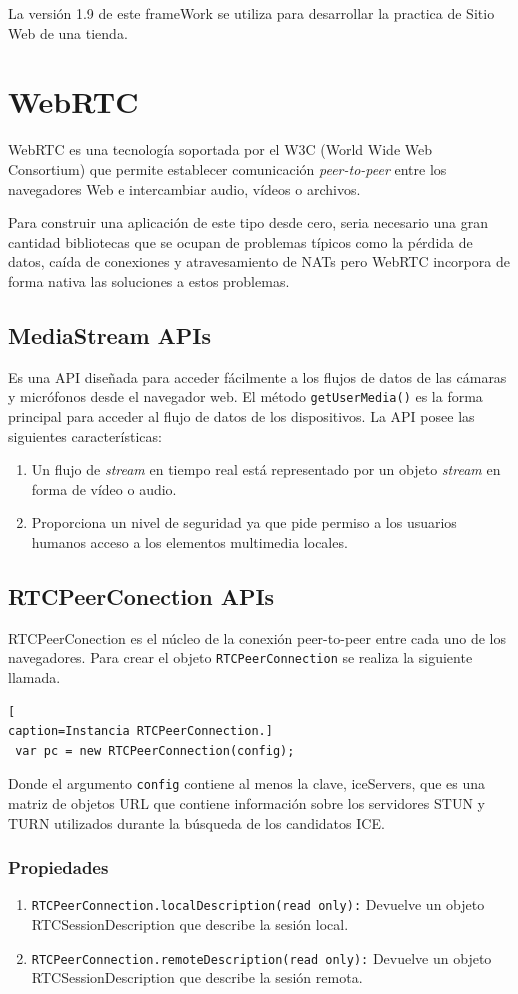 La versión 1.9 de este frameWork se utiliza para desarrollar la practica de Sitio Web de una tienda.
\section{WebRTC}
WebRTC es una tecnología soportada por el W3C (World Wide Web Consortium) que permite establecer comunicación \textit{peer-to-peer} entre los navegadores Web e intercambiar audio, vídeos o archivos.

Para construir una aplicación de este tipo desde cero, seria necesario una gran cantidad bibliotecas que se ocupan de problemas típicos como la pérdida de datos, caída de conexiones y atravesamiento de NATs pero WebRTC \cite{webRTC} incorpora de forma nativa las soluciones a estos problemas.
\subsection*{MediaStream APIs}
Es una API diseñada para acceder fácilmente a los flujos de datos de las cámaras y micrófonos desde el navegador web. El método \texttt{getUserMedia()} es la forma principal para acceder al flujo de datos de los dispositivos.
La API posee las siguientes características:
\begin{enumerate}
\item Un flujo de \textit{stream} en tiempo real está representado por un objeto \textit{stream} en forma de vídeo o audio.
\item Proporciona un nivel de seguridad ya que pide permiso a los usuarios humanos acceso a los elementos multimedia locales.
\end{enumerate}
\subsection*{RTCPeerConection APIs}
RTCPeerConection es el núcleo de la conexión peer-to-peer entre cada uno de los navegadores. Para crear el objeto \texttt{RTCPeerConnection} se realiza la siguiente llamada.
\begin{lstlisting}[
caption=Instancia RTCPeerConnection.]
 var pc = new RTCPeerConnection(config);
\end{lstlisting}
Donde el argumento \texttt{config} contiene al menos la clave, iceServers, que es una matriz de objetos URL que contiene información sobre los servidores STUN y TURN utilizados durante la búsqueda de los candidatos ICE.
\subsubsection*{Propiedades}
\begin{enumerate}
  \item \texttt{RTCPeerConnection.localDescription(read only):} Devuelve un objeto RTCSessionDescription que describe la sesión local.
  \item \texttt{RTCPeerConnection.remoteDescription(read only):} Devuelve un objeto RTCSessionDescription que describe la sesión remota.
\end{enumerate}
